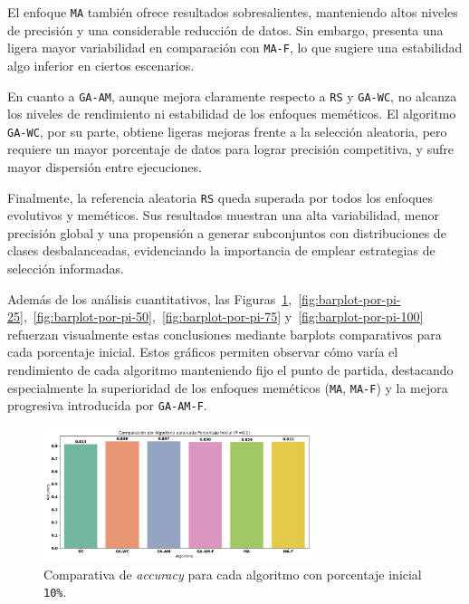 El enfoque \texttt{MA} también ofrece resultados sobresalientes, manteniendo altos niveles de precisión y una considerable reducción de datos.
Sin embargo, presenta una ligera mayor variabilidad en comparación con \texttt{MA-F}, lo que sugiere una estabilidad algo inferior en ciertos escenarios.

En cuanto a \texttt{GA-AM}, aunque mejora claramente respecto a \texttt{RS} y \texttt{GA-WC}, no alcanza los niveles de rendimiento ni estabilidad de los enfoques meméticos.
El algoritmo \texttt{GA-WC}, por su parte, obtiene ligeras mejoras frente a la selección aleatoria,
pero requiere un mayor porcentaje de datos para lograr precisión competitiva, y sufre mayor dispersión entre ejecuciones.

Finalmente, la referencia aleatoria \texttt{RS} queda superada por todos los enfoques evolutivos y meméticos.
Sus resultados muestran una alta variabilidad, menor precisión global y una propensión a generar subconjuntos con distribuciones de clases desbalanceadas,
evidenciando la importancia de emplear estrategias de selección informadas.

Además de los análisis cuantitativos, las Figuras~\ref{fig:barplot-por-pi-10},~\ref{fig:barplot-por-pi-25},~\ref{fig:barplot-por-pi-50},~\ref{fig:barplot-por-pi-75} y~\ref{fig:barplot-por-pi-100}
refuerzan visualmente estas conclusiones mediante barplots comparativos para cada porcentaje inicial.
Estos gráficos permiten observar cómo varía el rendimiento de cada algoritmo manteniendo fijo el punto de partida,
destacando especialmente la superioridad de los enfoques meméticos (\texttt{MA}, \texttt{MA-F}) y la mejora progresiva introducida por \texttt{GA-AM-F}.

\begin{figure}[htp]
    \centering
    \includegraphics[width=0.7\textwidth]{imagenes/evaluaciones/final/barplot-por-pi/pi-10.png}
    \caption{Comparativa de \textit{accuracy} para cada algoritmo con porcentaje inicial \texttt{10\%}.}
    \label{fig:barplot-por-pi-10}
\end{figure}

